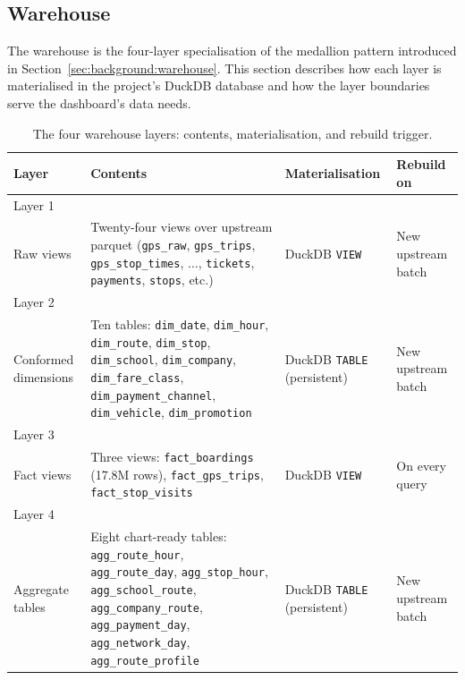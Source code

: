 \subsection{Warehouse}
\label{sec:proposed:warehouse_local}

The warehouse is the four-layer specialisation of the medallion
pattern introduced in Section~\ref{sec:background:warehouse}.
This section describes how each layer is materialised in the
project's DuckDB database and how the layer boundaries serve the
dashboard's data needs.

\begin{table}[H]
\centering
\caption{The four warehouse layers: contents, materialisation,
and rebuild trigger.}
\label{tab:proposed:warehouse}
\renewcommand{\arraystretch}{1.30}
\begin{tabularx}{\linewidth}{p{2.4cm}Xp{2.2cm}p{2.4cm}}
\hline
\textbf{Layer} & \textbf{Contents} & \textbf{Materialisation}
    & \textbf{Rebuild on} \\
\hline
Layer 1 \\ Raw views
    & Twenty-four views over upstream parquet
      (\texttt{gps\_raw}, \texttt{gps\_trips},
      \texttt{gps\_stop\_times}, $\dots$, \texttt{tickets},
      \texttt{payments}, \texttt{stops}, etc.)
    & DuckDB \texttt{VIEW}
    & New upstream batch \\
Layer 2 \\ Conformed dimensions
    & Ten tables: \texttt{dim\_date}, \texttt{dim\_hour},
      \texttt{dim\_route}, \texttt{dim\_stop}, \texttt{dim\_school},
      \texttt{dim\_company}, \texttt{dim\_fare\_class},
      \texttt{dim\_payment\_channel}, \texttt{dim\_vehicle},
      \texttt{dim\_promotion}
    & DuckDB \texttt{TABLE} (persistent)
    & New upstream batch \\
Layer 3 \\ Fact views
    & Three views: \texttt{fact\_boardings} (17.8M rows),
      \texttt{fact\_gps\_trips}, \texttt{fact\_stop\_visits}
    & DuckDB \texttt{VIEW}
    & On every query \\
Layer 4 \\ Aggregate tables
    & Eight chart-ready tables: \texttt{agg\_route\_hour},
      \texttt{agg\_route\_day}, \texttt{agg\_stop\_hour},
      \texttt{agg\_school\_route},
      \texttt{agg\_company\_route},
      \texttt{agg\_payment\_day},
      \texttt{agg\_network\_day},
      \texttt{agg\_route\_profile}
    & DuckDB \texttt{TABLE} (persistent)
    & New upstream batch \\
\hline
\end{tabularx}
\end{table}

